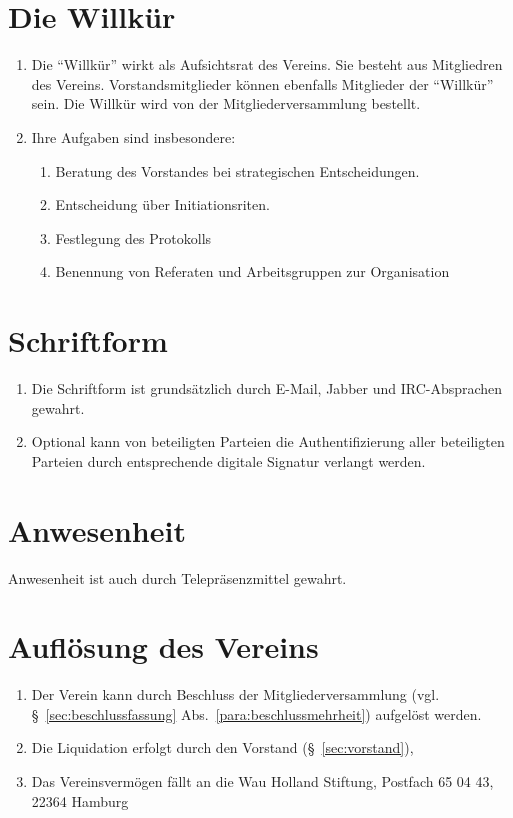 \documentclass[a4paper]{article}
\begin{document}
\section{Die Willkür}\label{sec:die_willkuer}

\begin{enumerate}
\item Die "`Willkür"' wirkt als Aufsichtsrat des Vereins. Sie besteht aus Mitgliedren des Vereins. Vorstandsmitglieder können ebenfalls Mitglieder der "`Willkür"' sein. Die Willkür wird von der Mitgliederversammlung bestellt.
\item Ihre Aufgaben sind insbesondere:
\begin{enumerate}
\item Beratung des Vorstandes bei strategischen Entscheidungen.
\item Entscheidung über Initiationsriten.
\item Festlegung des Protokolls
\item Benennung von Referaten und Arbeitsgruppen zur Organisation
\end{enumerate}
\end{enumerate}


\section{Schriftform}\label{sec:schriftform}

\begin{enumerate}
\item Die Schriftform ist grundsätzlich durch E-Mail, Jabber und IRC-Absprachen gewahrt.
\item Optional kann von beteiligten Parteien die Authentifizierung aller beteiligten Parteien durch entsprechende digitale Signatur verlangt werden.
\end{enumerate}


\section{Anwesenheit}\label{sec:anwesenheit}

Anwesenheit ist auch durch Telepräsenzmittel gewahrt.


\section{Auflösung des Vereins}\label{sec:aufloesung_des_vereins}

\begin{enumerate}
\item Der Verein kann durch Beschluss der Mitgliederversammlung (vgl. §~\ref{sec:beschlussfassung} Abs.~\ref{para:beschlussmehrheit}) aufgelöst werden.
\item Die Liquidation erfolgt durch den Vorstand (§~\ref{sec:vorstand}),
\item Das Vereinsvermögen fällt an die Wau Holland Stiftung, Postfach 65 04 43, 22364 Hamburg
\end{enumerate}
\end{document}
